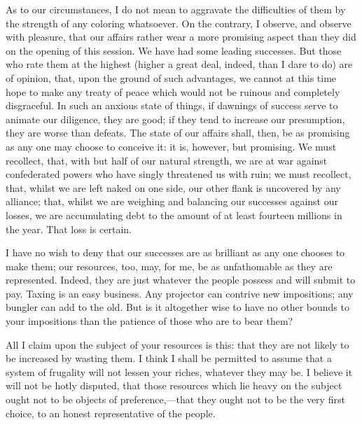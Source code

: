 As to our circumstances, I do not mean to aggravate the difficulties of them by the strength of any coloring whatsoever. On the contrary, I observe, and observe with pleasure, that our affairs rather wear a more promising aspect than they did on the opening of this session. We have had some leading successes. But those who rate them at the highest (higher a great deal, indeed, than I dare to do) are of opinion, that, upon the ground of such advantages, we cannot at this time hope to make any treaty of peace which would not be ruinous and completely disgraceful. In such an anxious state of things, if dawnings of success serve to animate our diligence, they are good; if they tend to increase our presumption, they are worse than defeats. The state of our affairs shall, then, be as promising as any one may choose to conceive it: it is, however, but promising. We must recollect, that, with but half of our natural strength, we are at war against confederated powers who have singly threatened us with ruin; we must recollect, that, whilst we are left naked on one side, our other flank is uncovered by any alliance; that, whilst we are weighing and balancing our successes against our losses, we are accumulating debt to the amount of at least fourteen millions in the year. That loss is certain.

I have no wish to deny that our successes are as brilliant as any one chooses to make them; our resources, too, may, for me, be as unfathomable as they are represented. Indeed, they are just whatever the people possess and will submit to pay. Taxing is an easy business. Any projector can contrive new impositions; any bungler can add to the old. But is it altogether wise to have no other bounds to your impositions than the patience of those who are to bear them?

All I claim upon the subject of your resources is this: that they are not likely to be increased by wasting them. I think I shall be permitted to assume that a system of frugality will not lessen your riches, whatever they may be. I believe it will not be hotly disputed, that those resources which lie heavy on the subject ought not to be objects of preference,—that they ought not to be the very first choice, to an honest representative of the people.

